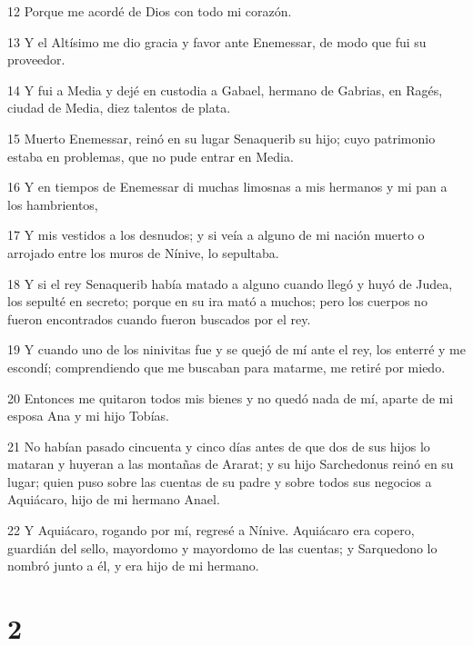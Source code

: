\par 12 Porque me acordé de Dios con todo mi corazón.
\par 13 Y el Altísimo me dio gracia y favor ante Enemessar, de modo que fui su proveedor.
\par 14 Y fui a Media y dejé en custodia a Gabael, hermano de Gabrias, en Ragés, ciudad de Media, diez talentos de plata.
\par 15 Muerto Enemessar, reinó en su lugar Senaquerib su hijo; cuyo patrimonio estaba en problemas, que no pude entrar en Media.
\par 16 Y en tiempos de Enemessar di muchas limosnas a mis hermanos y mi pan a los hambrientos,
\par 17 Y mis vestidos a los desnudos; y si veía a alguno de mi nación muerto o arrojado entre los muros de Nínive, lo sepultaba.
\par 18 Y si el rey Senaquerib había matado a alguno cuando llegó y huyó de Judea, los sepulté en secreto; porque en su ira mató a muchos; pero los cuerpos no fueron encontrados cuando fueron buscados por el rey.
\par 19 Y cuando uno de los ninivitas fue y se quejó de mí ante el rey, los enterré y me escondí; comprendiendo que me buscaban para matarme, me retiré por miedo.
\par 20 Entonces me quitaron todos mis bienes y no quedó nada de mí, aparte de mi esposa Ana y mi hijo Tobías.
\par 21 No habían pasado cincuenta y cinco días antes de que dos de sus hijos lo mataran y huyeran a las montañas de Ararat; y su hijo Sarchedonus reinó en su lugar; quien puso sobre las cuentas de su padre y sobre todos sus negocios a Aquiácaro, hijo de mi hermano Anael.
\par 22 Y Aquiácaro, rogando por mí, regresé a Nínive. Aquiácaro era copero, guardián del sello, mayordomo y mayordomo de las cuentas; y Sarquedono lo nombró junto a él, y era hijo de mi hermano.

\chapter{2}

